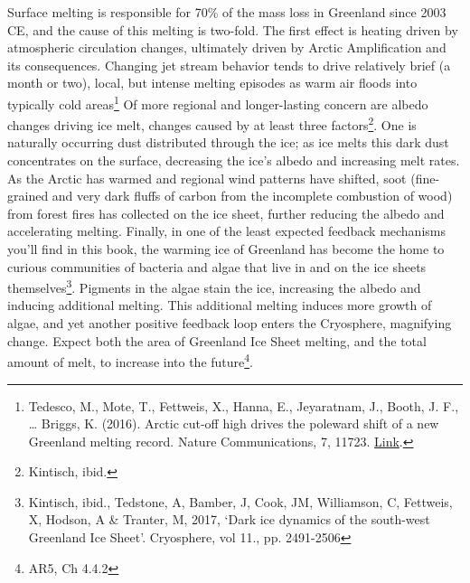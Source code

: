 \documentclass[amstex,12pt]{book}
\begin{document}
Surface melting is responsible for 70\% of the mass loss in Greenland since 2003 CE, and the cause of this melting is two-fold. The first effect is heating driven by atmospheric circulation changes, ultimately driven by Arctic Amplification and its consequences. Changing jet stream behavior tends to drive relatively brief (a month or two), local, but intense melting episodes as warm air floods into typically cold areas\footnote{Tedesco, M., Mote, T., Fettweis, X., Hanna, E., Jeyaratnam, J., Booth, J. F., … Briggs, K. (2016). Arctic cut-off high drives the poleward shift of a new Greenland melting record. Nature Communications, 7, 11723. \href{https://doi.org/10.1038/ncomms11723}{Link}.} Of more regional and longer-lasting concern are albedo changes driving ice melt, changes caused by at least three factors\footnote{Kintisch, ibid.}. One is naturally occurring dust distributed through the ice; as ice melts this dark dust concentrates on the surface, decreasing the ice's albedo and increasing melt rates. As the Arctic has warmed and regional wind patterns have shifted, soot (fine-grained and very dark fluffs of carbon from the incomplete combustion of wood) from forest fires has collected on the ice sheet, further reducing the albedo and accelerating melting. Finally, in one of the least expected feedback mechanisms you'll find in this book, the warming ice of Greenland has become the home to curious communities of bacteria and algae that live in and on the ice sheets themselves\footnote{Kintisch, ibid., Tedstone, A, Bamber, J, Cook, JM, Williamson, C, Fettweis, X, Hodson, A \& Tranter, M, 2017, ‘Dark ice dynamics of the south-west Greenland Ice Sheet’. Cryosphere, vol 11., pp. 2491-2506}. Pigments in the algae stain the ice, increasing the albedo and inducing additional melting. This additional melting induces more growth of algae, and yet another positive feedback loop enters the Cryosphere, magnifying change. Expect both the area of Greenland Ice Sheet melting, and the total amount of melt, to increase into the future\footnote{AR5, Ch 4.4.2}. \\
\end{document}

